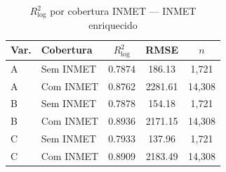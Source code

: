 \begin{table}[htbp]
\centering
\caption{$R^2_{\log}$ por cobertura INMET --- INMET enriquecido}
\label{tab:v4-r2-by-flag}
\begin{tabular}{llccc}
\toprule
Var. & Cobertura & $R^2_{\log}$ & RMSE & $n$ \\
\midrule
    A & Sem INMET & 0.7874 & 186.13 & 1,721 \\
    A & Com INMET & 0.8762 & 2281.61 & 14,308 \\
    B & Sem INMET & 0.7878 & 154.18 & 1,721 \\
    B & Com INMET & 0.8936 & 2171.15 & 14,308 \\
    C & Sem INMET & 0.7933 & 137.96 & 1,721 \\
    C & Com INMET & 0.8909 & 2183.49 & 14,308 \\
\bottomrule
\end{tabular}
\end{table}
